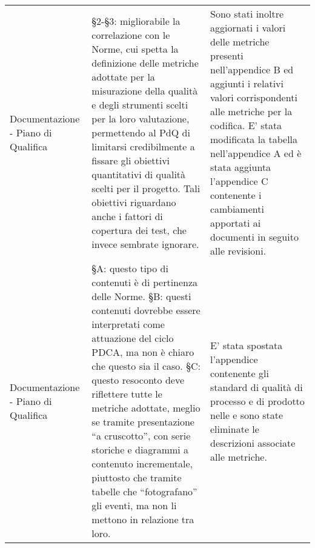 \begin{longtable}{ 
				>{\centering}p{} 
				>{\centering}p{}
				>{\centering\arraybackslash}p{}}
				 Documentazione - Piano di Qualifica
					&
				§2-§3: migliorabile la correlazione con le Norme, cui spetta la definizione delle metriche adottate per la misurazione della qualità e degli strumenti scelti per la loro valutazione, permettendo al PdQ di limitarsi credibilmente a fissare gli obiettivi quantitativi di qualità scelti per il progetto. Tali obiettivi riguardano anche i fattori di copertura dei test, che invece sembrate ignorare.
					&
				Sono stati inoltre aggiornati i valori delle metriche presenti nell'appendice B ed aggiunti i relativi valori corrispondenti alle metriche per la codifica. E' stata modificata la tabella nell'appendice A ed è stata aggiunta l'appendice C contenente i cambiamenti apportati ai documenti in seguito alle revisioni.
					\\
			
				Documentazione - Piano di Qualifica
					&
				§A: questo tipo di contenuti è di pertinenza delle Norme. §B: questi contenuti dovrebbe essere interpretati come attuazione del ciclo PDCA, ma non è chiaro che questo sia il caso. §C: questo resoconto deve riflettere tutte le metriche adottate, meglio se tramite presentazione “a cruscotto”, con serie storiche e diagrammi a contenuto incrementale, piuttosto che tramite tabelle che “fotografano” gli eventi, ma non li mettono in relazione tra loro.
					&
				E' stata spostata l'appendice contenente gli standard di qualità di processo e di prodotto nelle \NdP{} e sono state eliminate le descrizioni associate alle metriche.
					\\

			\end{longtable}
		
